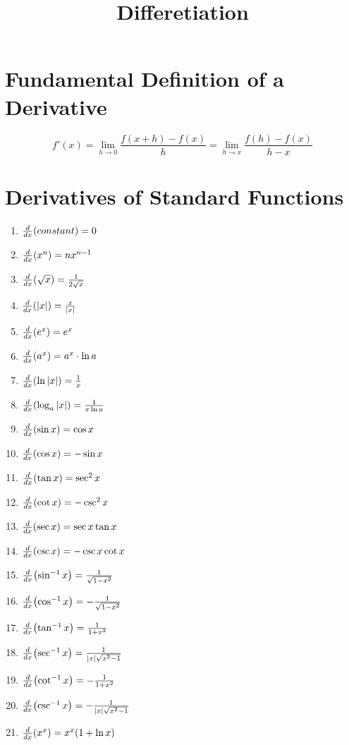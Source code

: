\documentclass{article}
\title{Differetiation}
\author{}
\date{}
\begin{document}
\maketitle

\section{Fundamental Definition of a Derivative}

$$
f'(x)=\lim\limits_{h \to 0}{\frac{f(x+h)-f(x)}{h}}=\lim\limits_{h \to x}{\frac{f(h)-f(x)}{h-x}}
$$

\section{Derivatives of Standard Functions}

\begin{enumerate}[i]
    \item $\dv{x}(constant)=0$
    \item $\dv{x}(x^n)=nx^{n-1}$
    \item $\dv{x}(\sqrt{x})=\frac{1}{2\sqrt{x}}$
    \item $\dv{x}(|x|)=\frac{x}{|x|}$
    \item $\dv{x}(e^x)=e^x$
    \item $\dv{x}(a^x)=a^x \cdot \ln a$
    \item $\dv{x}(\ln |x|)=\frac{1}{x}$
    \item $\dv{x}(\log_{a}{|x|})=\frac{1}{x\ln a}$
    \item $\dv{x}(\sin x)=\cos x$
    \item $\dv{x}(\cos x)=-\sin x$
    \item $\dv{x}(\tan x)=\sec^2 x$
    \item $\dv{x}(\cot x)=-\csc^2 x$
    \item $\dv{x}(\sec x)=\sec x \tan x$
    \item $\dv{x}(\csc x)=-\csc x \cot x$
    \item $\dv{x}(\sin^{-1}x)=\frac{1}{\sqrt{1-x^2}}$
    \item $\dv{x}(\cos^{-1}x)=-\frac{1}{\sqrt{1-x^2}}$
    \item $\dv{x}(\tan^{-1}x)=\frac{1}{1+x^2}$
    \item $\dv{x}(\sec^{-1}x)=\frac{1}{|x|\sqrt{x^2-1}}$
    \item $\dv{x}(\cot^{-1}x)=-\frac{1}{1+x^2}$
    \item $\dv{x}(\csc^{-1}x)=-\frac{1}{|x|\sqrt{x^2-1}}$
    \item $\dv{x}(x^x)=x^x(1+\ln x)$
\end{enumerate}
\end{document}
